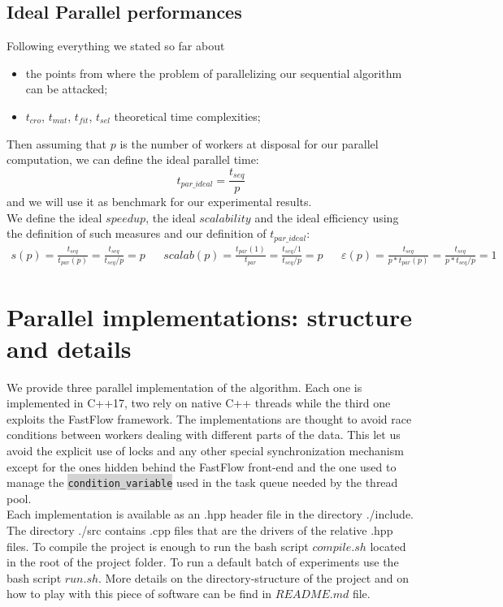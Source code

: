 \documentclass[11pt]{article}
\newcommand{\inlinecode}[2]{\colorbox{lightgray}{\lstinline[language=#1]$#2$}}
\begin{document}
\subsection{Ideal Parallel performances}
Following everything we stated so far about
\begin{itemize}
  \item the points from where the problem of parallelizing our sequential algorithm can be attacked;
  \item  $ t_{cro}$, $ t_{mut}$, $t_{fit}$, $t_{sel}$ theoretical time complexities;
\end{itemize} 
Then assuming that $ p $ is the number of workers at disposal for our parallel computation, we can define the ideal parallel time:
\[ t_{par\_ideal} = \frac{t_{seq}}{p} \]
and we will use it as benchmark for our experimental results.\\
We define the ideal $ speedup $, the ideal $ scalability $ and the ideal efficiency using the definition of such measures and our definition of $ t_{par\_ideal} $:
\begin{align*}
s(p) = \frac{t_{seq}}{t_{par}(p)} = \frac{t_{seq}}{t_{seq}/p} = p 
&
& scalab(p) = \frac{t_{par}(1)}{t_{par}} = \frac{t_{seq}/1}{t_{seq}/p} = p 
&
& \varepsilon(p) = \frac{t_{seq}}{p*t_{par}(p)} = \frac{t_{seq}}{p*t_{seq}/p} = 1 
\end{align*}



\section{Parallel implementations: structure and details}
We provide three parallel implementation of the algorithm. Each one is implemented in C++17, two rely on native C++ threads while the third one exploits the FastFlow framework. The implementations are thought to avoid race conditions between workers dealing with different parts of the data. This let us avoid the explicit use of locks and any other special synchronization mechanism except for the ones hidden behind the FastFlow front-end and the one used to manage the \inlinecode{C++}{condition_variable} used in the task queue needed by the thread pool.\\
Each implementation is available as an .hpp header file in the directory ./include.
The directory ./src contains .cpp files that are the drivers of the relative .hpp files.
To compile the project is enough to run the bash script $ compile.sh $ located in the root of the project folder. To run a default batch of experiments use the bash script $ run.sh $. More details on the directory-structure of the project and on how to play with this piece of software can be find in $ README.md $ file.
\end{document}
